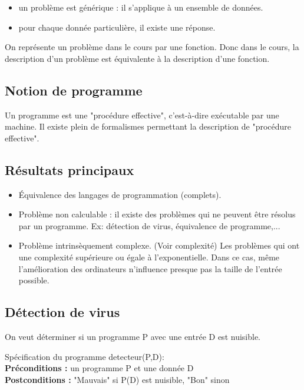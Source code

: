 \begin{itemize}
	\item un problème est générique : il s'applique à un ensemble de données.
	\item pour chaque donnée particulière, il existe une réponse.
\end{itemize}
On représente un problème dans le cours par une fonction. Donc dans le cours,
la description d'un problème est équivalente à la description d'une fonction.

\subsection{Notion de programme}
\label{ssub:notion_de_programme}

Un programme est une "procédure effective", c'est-à-dire exécutable par une machine.
Il existe plein de formalismes permettant la description de "procédure effective".


\subsection{Résultats principaux}
\label{sub:r_sultat_principaux}

\begin{itemize}
	\item Équivalence des langages de programmation (complets).
	\item Problème non calculable : il existe des problèmes qui ne peuvent 
		être résolus par un programme. Ex: détection de virus, équivalence
		de programme,...
	\item Problème intrinsèquement complexe. (Voir complexité) Les problèmes
		qui ont une complexité supérieure ou égale à l'exponentielle. Dans
		ce cas, même l'amélioration des ordinateurs n'influence presque pas
		la taille de l'entrée possible.
\end{itemize}


\subsection{Détection de virus}
\label{sub:d_tection_de_virus}
On veut déterminer si un programme P avec une entrée D est nuisible.

Spécification du programme detecteur(P,D):\\
\textbf{Préconditions :} un programme P et une donnée D\\
\textbf{Postconditions :} "Mauvais" si P(D) est nuisible,
		"Bon" sinon

